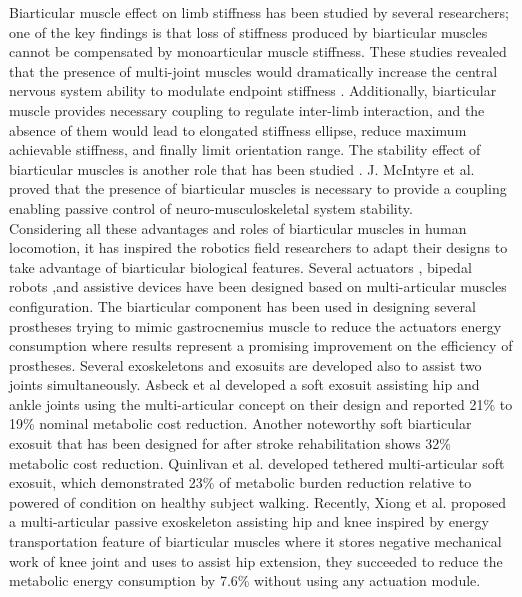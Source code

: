 \documentclass[10pt,letterpaper]{article}
\begin{document}
Biarticular muscle effect on limb stiffness has been studied by several researchers\cite{69,70}; one of the key findings is that loss of stiffness produced by biarticular muscles cannot be compensated by monoarticular muscle stiffness\cite{69,70}. These studies revealed that the presence of multi-joint muscles would dramatically increase the central nervous system ability to modulate endpoint stiffness \cite{70,71}. Additionally, biarticular muscle provides necessary coupling to regulate inter-limb interaction\cite{72}, and the absence of them would lead to elongated stiffness ellipse, reduce maximum achievable stiffness, and finally limit orientation range\cite{69}.
The stability effect of biarticular muscles is another role that has been studied \cite{73,74,76}. J. McIntyre et al. \cite{73} proved that the presence of biarticular muscles is necessary to provide a coupling enabling passive control of neuro-musculoskeletal system stability.\\

Considering all these advantages and roles of biarticular muscles in human locomotion, it has inspired the robotics field researchers to adapt their designs to take advantage of biarticular biological features\cite{53}. Several actuators \cite{77,78}, bipedal robots\cite{74,75,76} ,and assistive devices\cite{53} have been designed based on multi-articular muscles configuration.
The biarticular component has been used in designing several prostheses trying to mimic gastrocnemius muscle to reduce the actuators energy consumption\cite{82,83,84,86,87} where results represent a promising improvement on the efficiency of prostheses\cite{87}. Several exoskeletons and exosuits are developed also to assist two joints simultaneously\cite{43,47,49,79,80,81}. Asbeck et al\cite{47} developed a soft exosuit assisting hip and ankle joints using the multi-articular concept on their design and reported 21\% to 19\% nominal metabolic cost reduction. Another noteworthy soft biarticular exosuit that has been designed for after stroke rehabilitation shows 32\% metabolic cost reduction\cite{43}. Quinlivan et al. \cite{80}  developed tethered multi-articular soft exosuit, which demonstrated 23\% of metabolic burden reduction relative to powered of condition on healthy subject walking. Recently, Xiong et al. \cite{88} proposed a multi-articular passive exoskeleton assisting hip and knee inspired by energy transportation feature of biarticular muscles where it stores negative mechanical work of knee joint and uses to assist hip extension, they succeeded to reduce the metabolic energy consumption by 7.6\% without using any actuation module.\\
\end{document}
